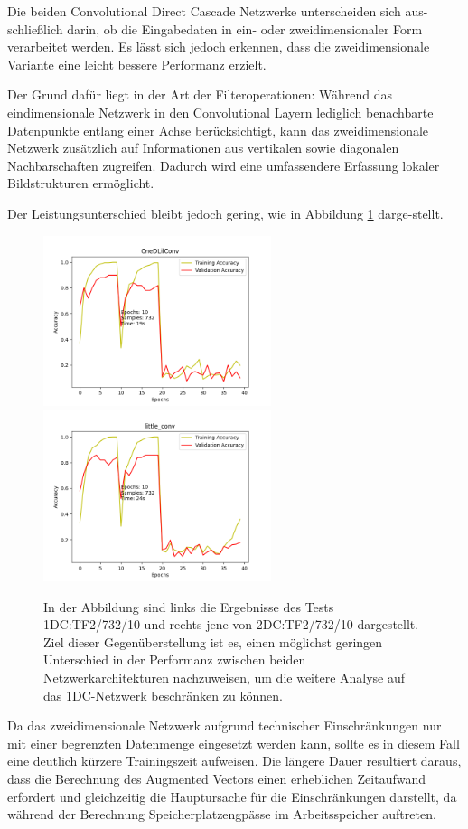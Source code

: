 Die beiden Convolutional Direct Cascade Netzwerke unterscheiden sich aus-schließlich darin, ob die Eingabedaten in ein- oder zweidimensionaler 
Form verarbeitet werden. Es lässt sich jedoch erkennen, dass die zweidimensionale Variante eine leicht bessere Performanz erzielt.

Der Grund dafür liegt in der Art der Filteroperationen: Während das eindimensionale Netzwerk in den Convolutional Layern lediglich benachbarte 
Datenpunkte entlang einer Achse berücksichtigt, kann das zweidimensionale Netzwerk zusätzlich auf Informationen aus vertikalen sowie diagonalen 
Nachbarschaften zugreifen. Dadurch wird eine umfassendere Erfassung lokaler Bildstrukturen ermöglicht.

Der Leistungsunterschied bleibt jedoch gering, wie in Abbildung \ref{fig:dim} darge-stellt.

\begin{figure}[htpb]
    \includegraphics[height=5cm]{../../Plots/ba_plots/dimensionality/1dim_tr.png}
    \includegraphics[height=5cm]{../../Plots/ba_plots/dimensionality/2dim_tr.png}
    \caption{\label{fig:dim} 
    \small{In der Abbildung sind links die Ergebnisse des Tests 1DC:TF2/732/10 und rechts jene von 2DC:TF2/732/10 dargestellt. Ziel dieser 
    Gegenüberstellung ist es, einen möglichst geringen Unterschied in der Performanz zwischen beiden Netzwerkarchitekturen nachzuweisen, um 
    die weitere Analyse auf das 1DC-Netzwerk beschränken zu können.}}
\end{figure}

Da das zweidimensionale Netzwerk aufgrund technischer Einschränkungen nur mit einer begrenzten Datenmenge eingesetzt werden kann, sollte es in 
diesem Fall eine deutlich kürzere Trainingszeit aufweisen. 
Die längere Dauer resultiert daraus, dass die Berechnung des Augmented Vectors einen erheblichen Zeitaufwand erfordert und gleichzeitig die 
Hauptursache für die Einschränkungen darstellt, da während der Berechnung Speicherplatzengpässe im Arbeitsspeicher auftreten.

